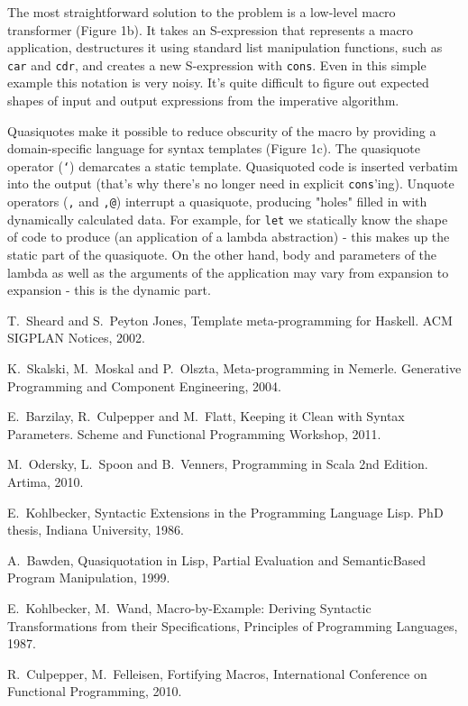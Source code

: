 \documentclass[10pt,journal,a4paper]{IEEEtran}
\begin{document}
The most straightforward solution to the problem is a low-level macro transformer (Figure 1b).
It takes an S-expression that represents a macro application, destructures it using standard
list manipulation functions, such as \texttt{car} and \texttt{cdr}, and creates a new S-expression
with \texttt{cons}. Even in this simple example this notation is very noisy. It's quite difficult
to figure out expected shapes of input and output expressions from the imperative algorithm.

Quasiquotes \cite{bawden99} make it possible to reduce obscurity of the macro by providing
a domain-specific language for syntax templates (Figure 1c). The quasiquote operator (\texttt{`})
demarcates a static template. Quasiquoted code is inserted verbatim into the output
(that's why there's no longer need in explicit \texttt{cons}'ing). Unquote operators (\texttt{,}
and \texttt{,@}) interrupt a quasiquote, producing "holes" filled in with dynamically calculated
data. For example, for \texttt{let} we statically know the shape of code to produce (an application
of a lambda abstraction) - this makes up the static part of the quasiquote. On the other hand,
body and parameters of the lambda as well as the arguments of the application may vary from
expansion to expansion - this is the dynamic part.

\begin{thebibliography}{1}

T.~Sheard and S.~Peyton Jones,
Template meta-programming for Haskell.
ACM SIGPLAN Notices, 2002.

K.~Skalski, M.~Moskal and P.~Olszta,
Meta-programming in Nemerle.
Generative Programming and Component Engineering, 2004.

E.~Barzilay, R.~Culpepper and M.~Flatt,
Keeping it Clean with Syntax Parameters.
Scheme and Functional Programming Workshop, 2011.

M.~Odersky, L.~Spoon and B.~Venners,
Programming in Scala 2nd Edition.
Artima, 2010.

E.~Kohlbecker,
Syntactic Extensions in the Programming Language Lisp.
PhD thesis, Indiana University, 1986.

A.~Bawden,
Quasiquotation in Lisp,
Partial Evaluation and SemanticBased Program Manipulation, 1999.

E.~Kohlbecker, M.~Wand,
Macro-by-Example: Deriving Syntactic Transformations from their Specifications,
Principles of Programming Languages, 1987.

R.~Culpepper, M.~Felleisen,
Fortifying Macros,
International Conference on Functional Programming, 2010.

\end{thebibliography}
\end{document}
